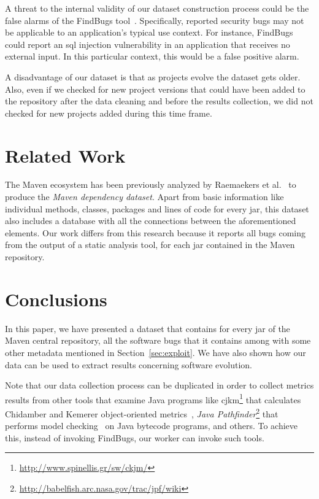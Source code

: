 \documentclass{sig-alternate}
\begin{document}
A threat to the internal validity of our dataset
construction process could be the false
alarms of the FindBugs tool~\cite{AP10}.
Specifically, reported security bugs may not
be applicable to an application's typical use context.
For instance, FindBugs could report an {\sc sql}
injection vulnerability
in an application that receives no external input.
In this particular context, this would be a false
positive alarm.

A disadvantage of our dataset is that as projects evolve
the dataset gets older. Also, even if we checked for
new project versions that could have been added
to the repository after the data cleaning and before
the results collection, we did not checked for new
projects added during this time frame.

\section{Related Work}
\label{sec:rel}

The Maven ecosystem has been previously analyzed by
Raemaekers et al.~\cite{RDV13}
to produce the {\it Maven dependency dataset}.
Apart from basic information like individual methods, classes,
packages and lines of code for every {\sc jar}, this dataset
also includes a database with all the
connections between the aforementioned elements.
Our work differs from this research because it
reports all bugs coming from the output of a
static analysis tool, for each {\sc jar}
contained in the Maven repository.

\section{Conclusions}
\label{sec:conc}

In this paper, we have presented a dataset that contains
for every {\sc jar} of the Maven central repository,
all the software bugs that it contains among with some
other metadata mentioned in Section~\ref{sec:exploit}.
We have also shown how our data can be
used to extract results concerning software evolution.

Note that our data collection process can be duplicated
in order to collect metrics results from other tools that
examine Java programs like
{\sc cjkm}\footnote{\small \url{http://www.spinellis.gr/sw/ckjm/}}
that calculates Chidamber and Kemerer
object-oriented metrics~\cite{CK91},
{\it Java Pathfinder}\footnote{\small \url{http://babelfish.arc.nasa.gov/trac/jpf/wiki}}
that performs
model checking~\cite{CEES09} on Java bytecode programs,
and others. To achieve this, instead of invoking
FindBugs, our worker can invoke such tools.
\end{document}
